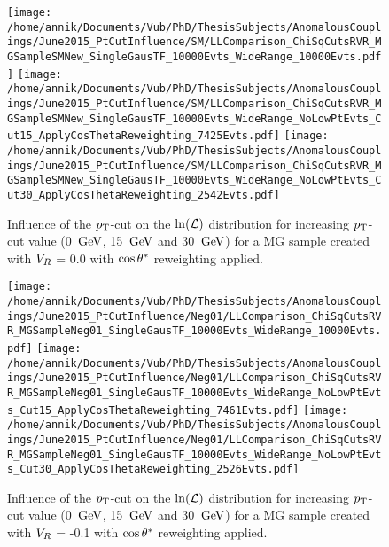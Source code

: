 \begin{figure}[h!t]
 \centering
 \texttt{[image: /home/annik/Documents/Vub/PhD/ThesisSubjects/AnomalousCouplings/June2015\_PtCutInfluence/SM/LLComparison\_ChiSqCutsRVR\_MGSampleSMNew\_SingleGausTF\_10000Evts\_WideRange\_10000Evts.pdf]}
 \texttt{[image: /home/annik/Documents/Vub/PhD/ThesisSubjects/AnomalousCouplings/June2015\_PtCutInfluence/SM/LLComparison\_ChiSqCutsRVR\_MGSampleSMNew\_SingleGausTF\_10000Evts\_WideRange\_NoLowPtEvts\_Cut15\_ApplyCosThetaReweighting\_7425Evts.pdf]}
 \texttt{[image: /home/annik/Documents/Vub/PhD/ThesisSubjects/AnomalousCouplings/June2015\_PtCutInfluence/SM/LLComparison\_ChiSqCutsRVR\_MGSampleSMNew\_SingleGausTF\_10000Evts\_WideRange\_NoLowPtEvts\_Cut30\_ApplyCosThetaReweighting\_2542Evts.pdf]}
 \caption{Influence of the $p_{\textrm T}$-cut on the $\ln(\mathcal{L})$ distribution for increasing $p_{\textrm T}$-cut value (0 $\, \mathrm{GeV}$, 15 $\, \mathrm{GeV}$ and 30 $\, \mathrm{GeV}$) for a MG sample created with $V_{R}$ = 0.0 with $\cos \theta^{*}$ reweighting applied.}
 \label{fig::CosThetaSM}
\end{figure}

\begin{figure}[h!t]
 \centering
 \texttt{[image: /home/annik/Documents/Vub/PhD/ThesisSubjects/AnomalousCouplings/June2015\_PtCutInfluence/Neg01/LLComparison\_ChiSqCutsRVR\_MGSampleNeg01\_SingleGausTF\_10000Evts\_WideRange\_10000Evts.pdf]}
 \texttt{[image: /home/annik/Documents/Vub/PhD/ThesisSubjects/AnomalousCouplings/June2015\_PtCutInfluence/Neg01/LLComparison\_ChiSqCutsRVR\_MGSampleNeg01\_SingleGausTF\_10000Evts\_WideRange\_NoLowPtEvts\_Cut15\_ApplyCosThetaReweighting\_7461Evts.pdf]}
 \texttt{[image: /home/annik/Documents/Vub/PhD/ThesisSubjects/AnomalousCouplings/June2015\_PtCutInfluence/Neg01/LLComparison\_ChiSqCutsRVR\_MGSampleNeg01\_SingleGausTF\_10000Evts\_WideRange\_NoLowPtEvts\_Cut30\_ApplyCosThetaReweighting\_2526Evts.pdf]}
 \caption{Influence of the $p_{\textrm T}$-cut on the $\ln(\mathcal{L})$ distribution for increasing $p_{\textrm T}$-cut value (0 $\, \mathrm{GeV}$, 15 $\, \mathrm{GeV}$ and 30 $\, \mathrm{GeV}$) for a MG sample created with $V_{R}$ = -0.1 with $\cos \theta^{*}$ reweighting applied.}
 \label{fig::CosThetaNeg01}
\end{figure}

